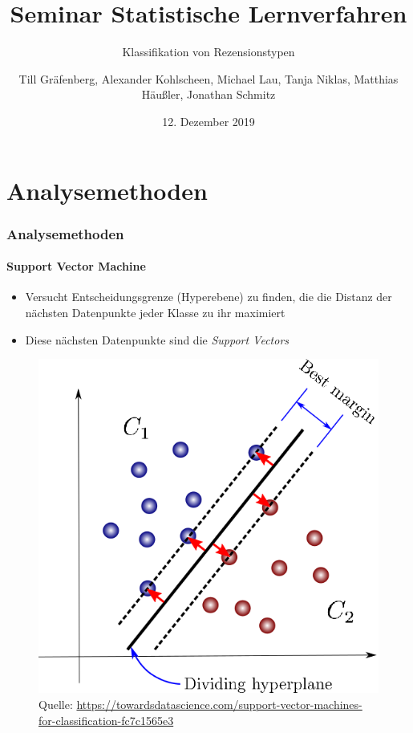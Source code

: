 \documentclass{beamer}
\title{Seminar Statistische Lernverfahren}
\subtitle{Klassifikation von Rezensionstypen}
\author[T.G., A.K., M.L., T.N., M.H., J.S.]{Till Gräfenberg, Alexander Kohlscheen, Michael Lau, Tanja Niklas, Matthias Häußler, Jonathan Schmitz}
\date{12. Dezember 2019}
\newcommand*{\quelle}{%
	\footnotesize Quelle:
}
\begin{document}
\begin{frame}
\thispagestyle{empty}
\titlepage
\end{frame}

\section{Analysemethoden}
\begin{frame}
\frametitle{Analysemethoden}
\framesubtitle{Support Vector Machine}
\begin{itemize}\setlength\parskip{12pt}
\item Versucht Entscheidungsgrenze (Hyperebene) zu finden, die die Distanz der nächsten Datenpunkte jeder Klasse zu ihr maximiert
\item Diese nächsten Datenpunkte sind die \textit{Support Vectors}
\end{itemize}
\begin{figure}
	\centering
	\includegraphics[scale=0.25]{svm.png}\\
	\quelle\url{https://towardsdatascience.com/support-vector-machines-for-classification-fc7c1565e3}
\end{figure}
\end{frame}
\end{document}
